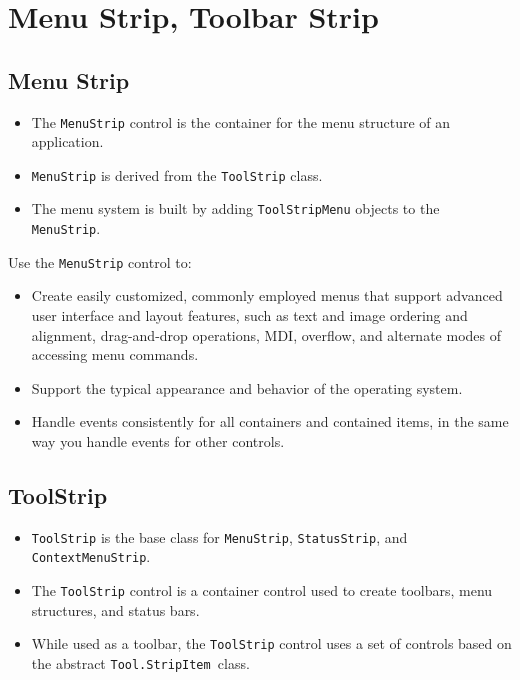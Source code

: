 
%


\section{Menu Strip, Toolbar Strip}
\subsection{Menu Strip}
\begin{itemize}
	\item The \texttt{MenuStrip} control is the container for the menu structure of an application.
	\item \texttt{MenuStrip} is derived from the \texttt{ToolStrip} class.
	\item The menu system is built by adding \texttt{ToolStripMenu} objects to the \texttt{MenuStrip}.
\end{itemize}


Use the \texttt{MenuStrip} control to:

\begin{itemize}
	\item Create easily customized, commonly employed menus that support advanced user interface
	and layout features, such as text and image ordering and alignment, drag-and-drop
	operations, MDI, overflow, and alternate modes of accessing menu commands.
	\item Support the typical appearance and behavior of the operating system.
	\item Handle events consistently for all containers and contained items, in the same way you
	handle events for other controls.
\end{itemize}

\subsection{ToolStrip}
\begin{itemize}
	\item \texttt{ToolStrip} is the base class for \texttt{MenuStrip}, \texttt{StatusStrip}, and \texttt{ContextMenuStrip}.
	\item The \texttt{ToolStrip} control is a container control used to create toolbars, menu structures, and status bars.
	\item While used as a toolbar, the \texttt{ToolStrip} control uses a set of controls based on the abstract \texttt{Tool.StripItem }class.
\end{itemize}


